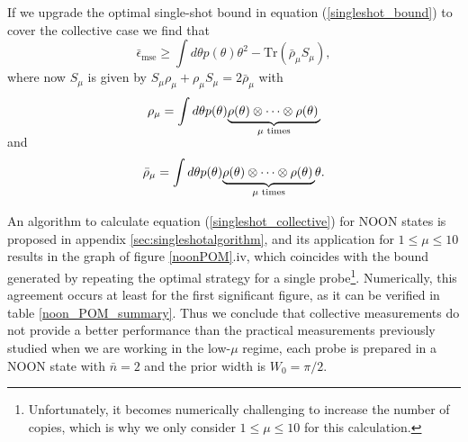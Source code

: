 If we upgrade the optimal single-shot bound in equation (\ref{singleshot_bound}) to cover the collective case we find that
\begin{equation}
\bar{\epsilon}_\mathrm{mse} \geqslant \int d\theta p(\theta) \theta^2 - \mathrm{Tr}\left(\bar{\rho}_\mu S_\mu\right),
\label{singleshot_collective}
\end{equation} 
where now $S_\mu$ is given by $S_\mu \rho_\mu + \rho_\mu S_\mu = 2 \bar{\rho}_\mu$ with 
\begin{equation}
\rho_\mu = \int d\theta p(\theta) \smash[b]{ \underbrace{\rho(\theta) \otimes \cdots \otimes \rho(\theta)\,}_\text{$\mu$ times}}
\label{zerothmoment_collective}
\end{equation}
and
\begin{equation}
\bar{\rho}_\mu = \int d\theta p(\theta) \smash[b]{ \underbrace{\rho(\theta) \otimes \cdots \otimes \rho(\theta)\,}_\text{$\mu$ times}}\theta.
\label{firstmoment_collective}
\end{equation}
~\\[-10pt]

An algorithm to calculate equation (\ref{singleshot_collective}) for NOON states is proposed in appendix \ref{sec:singleshotalgorithm}, and its application for $1\leqslant \mu \leqslant 10$ results in the graph of figure \ref{noonPOM}.iv, which coincides with the bound generated by repeating the optimal strategy for a single probe\footnote{Unfortunately, it becomes numerically challenging to increase the number of copies, which is why we only consider $1\leqslant \mu \leqslant 10$ for this calculation.}. Numerically, this agreement occurs at least for the first significant figure, as it can be verified in table \ref{noon_POM_summary}. Thus we conclude that collective measurements do not provide a better performance than the practical measurements previously studied when we are working in the low-$\mu$ regime, each probe is prepared in a NOON state with $\bar{n} = 2$ and the prior width is $W_0=\pi/2$.


